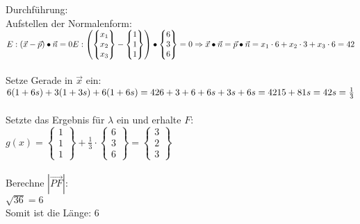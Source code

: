 Durchführung: \\
Aufstellen der Normalenform: \\
$
E: (\vec{x} - \vec{p}) \bullet \vec{n} = 0\\
E: 
\begin{pmatrix}
    \begin{Bmatrix}
        x_1 \\ x_2 \\ x_3
    \end{Bmatrix}
    - 
    \begin{Bmatrix}
        1 \\ 1 \\ 1
    \end{Bmatrix}
\end{pmatrix}
\bullet
\begin{Bmatrix}
    6 \\ 3 \\ 6
\end{Bmatrix}
= 0 \\
\Rightarrow
\vec{x} \bullet \vec{n} = \vec{p} \bullet \vec{n} \\
= x_1\cdot 6 + x_2 \cdot 3 + x_3 \cdot 6 = 42
$
\\
\
\\
Setze Gerade in $\vec{x}$ ein: \\
$
6(1+6s) + 3(1+3s) + 6(1+6s) = 42 \\
6 + 3 + 6 + 6s + 3s + 6s = 42 \\
15 + 81s = 42
s = \frac{1}{3}
$
\\
\
\\ 
Setzte das Ergebnis für $\lambda$ ein und erhalte $F$: \\
$
g(x) = 
\begin{Bmatrix}
    1 \\ 1 \\ 1
\end{Bmatrix}
+ \frac{1}{3} \cdot
\begin{Bmatrix}
    6 \\ 3 \\ 6
\end{Bmatrix}
= 
\begin{Bmatrix}
    3 \\ 2 \\ 3
\end{Bmatrix}
$
\\
\
\\
Berechne $|\overrightarrow{PF}|$: \\
$\sqrt{36} = 6$
\\
Somit ist die Länge: $6$


